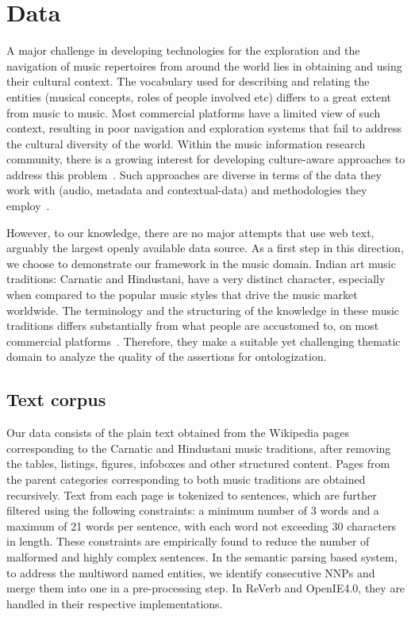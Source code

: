 \documentclass{llncs}
\begin{document}
\section{Data}
\label{sec:data}
A major challenge in developing technologies for the exploration and the navigation of music repertoires from around the world lies in obtaining and using their cultural context. The vocabulary used for describing and relating the entities (musical concepts, roles of people involved etc) differs to a great extent from music to music. Most commercial platforms have a limited view of such context, resulting in poor navigation and exploration systems that fail to address the cultural diversity of the world.  Within the music information research community, there is a growing interest for developing culture-aware approaches to address this problem~\cite{Serra2011}. Such approaches are diverse in terms of the data they work with (audio, metadata and contextual-data) and methodologies they employ~\cite{Serra2013a}. 

However, to our knowledge, there are no major attempts that use web text, arguably the largest openly available data source. As a first step in this direction, we choose to demonstrate our framework in the music domain. Indian art music traditions: Carnatic and Hindustani, have a very distinct character, especially when compared to the popular music styles that drive the music market worldwide. The terminology and the structuring of the knowledge in these music traditions differs substantially from what people are accustomed to, on most commercial platforms~\cite{Krishna2012}. Therefore, they make a suitable yet challenging thematic domain to analyze the quality of the assertions for ontologization.

\subsection{Text corpus}
Our data consists of the plain text obtained from the Wikipedia pages corresponding to the Carnatic and Hindustani music traditions, after removing the tables, listings, figures, infoboxes and other structured content. Pages from the parent categories corresponding to both music traditions are obtained recursively. Text from each page is tokenized to sentences, which are further filtered using the following constraints: a minimum number of 3 words and a maximum of 21 words per sentence, with each word not exceeding 30 characters in length. These constraints are empirically found to reduce the number of malformed and highly complex sentences. In the semantic parsing based system, to address the multiword named entities, we identify consecutive NNPs and merge them into one in a pre-processing step. In ReVerb and OpenIE4.0, they are handled in their respective implementations.
\end{document}
